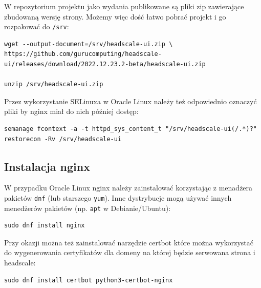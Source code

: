 \documentclass{report}
\numberwithin{equation}{section}
\begin{document}
W repozytorium projektu jako wydania publikowane są pliki zip zawierające zbudowaną wersję strony. Możemy więc dość łatwo pobrać projekt i go rozpakować do \texttt{/srv}:
\begin{verbatim}
wget --output-document=/srv/headscale-ui.zip \
https://github.com/gurucomputing/headscale-ui/releases/download/2022.12.23.2-beta/headscale-ui.zip

unzip /srv/headscale-ui.zip
\end{verbatim}
Przez wykorzystanie SELinuxa w Oracle Linux należy też odpowiednio oznaczyć pliki by nginx miał do nich później dostęp:
\begin{verbatim}
semanage fcontext -a -t httpd_sys_content_t "/srv/headscale-ui(/.*)?"
restorecon -Rv /srv/headscale-ui
\end{verbatim}
\subsection{Instalacja nginx}

W przypadku Oracle Linux nginx należy zainstalować korzystając z menadżera pakietów \texttt{dnf} (lub starszego \texttt{yum}). Inne dystrybucje mogą używać innych menedżerów pakietów (np. \texttt{apt} w Debianie/Ubuntu):

\begin{verbatim}
sudo dnf install nginx
\end{verbatim}

Przy okazji można też zainstalować narzędzie certbot które można wykorzystać do wygenerowania certyfikatów dla domeny na której będzie serwowana strona i headscale:

\begin{verbatim}
sudo dnf install certbot python3-certbot-nginx
\end{verbatim}
\end{document}
